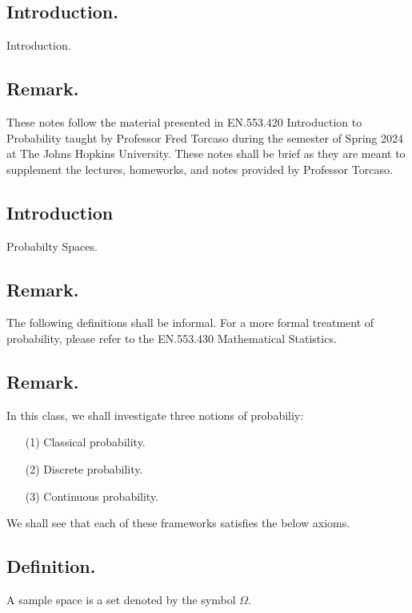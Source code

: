 \documentclass[titlepage]{article}
\begin{document}
\maketitle

\tableofcontents

\newpage {}

\subsection{Introduction.} Introduction.

\subsection{Remark.} These notes follow the material presented in EN.553.420 Introduction to Probability taught by Professor Fred Torcaso during the semester of Spring 2024 at The Johns Hopkins University. These notes shall be brief as they are meant to supplement the lectures, homeworks, and notes provided by Professor Torcaso.

\newpage {}

\subsection{Introduction} Probabilty Spaces.

\subsection{Remark.} The following definitions shall be informal. For a more formal treatment of probability, please refer to the EN.553.430 Mathematical Statistics.

\subsection{Remark.} In this class, we shall investigate three notions of probabiliy:
\begin{enumerate}
\item[(1)] Classical probability.
\item[(2)] Discrete probability.
\item[(3)] Continuous probability.
\end{enumerate}
We shall see that each of these frameworks satisfies the below axioms.

\subsection{Definition.} A sample space is a set denoted by the symbol $\Omega$.
\end{document}
